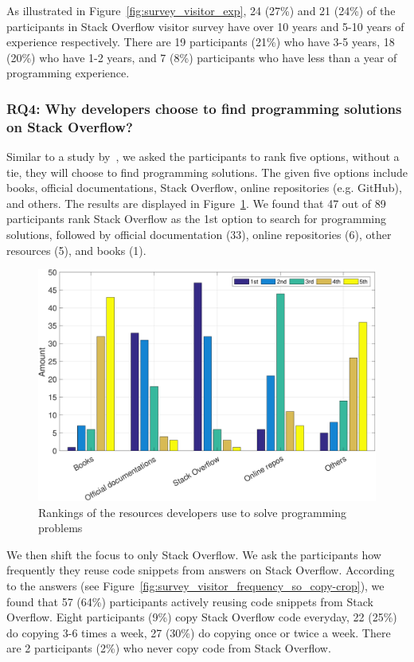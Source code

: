 \documentclass{svjour3}                     %
\begin{document}
As illustrated in Figure~\ref{fig:survey_visitor_exp}, 24 (27\%) and 21 (24\%)
of the participants in Stack Overflow visitor survey have over 10 years and 5-10
years of experience respectively. There are 19 participants (21\%) who have 3-5
years, 18 (20\%) who have 1-2 years, and 7 (8\%) participants who have less than a
year of programming experience.

\subsubsection*{RQ4: Why developers choose to find programming solutions on Stack Overflow?}

Similar to a study by~\cite{Acar2016}, we asked the participants to rank five options, without a tie, they will choose to
find programming solutions. The given five options include books, official documentations, Stack Overflow,
online repositories (e.g. GitHub), and others. The results are displayed in Figure~\ref{fig:survey_visitor_rankings-crop}.
We found that 47 out of 89 participants rank Stack Overflow as the 1st option to search for programming solutions, followed
by official documentation (33), online repositories (6), other resources (5), and books (1).

\begin{figure} \centering
	\includegraphics[width=.5\linewidth]{survey_visitor_rankings-crop} 
	\caption{Rankings of the resources developers use to solve programming problems}
	\label{fig:survey_visitor_rankings-crop} 
\end{figure}

We then shift the focus to only Stack Overflow. We ask the participants how frequently they reuse code snippets from answers on Stack Overflow.
According to the answers (see Figure~\ref{fig:survey_visitor_frequency_so_copy-crop}), we found that 57 (64\%) participants actively reusing
code snippets from Stack Overflow. Eight participants (9\%) copy Stack Overflow
code everyday, 22 (25\%) do copying 3-6 times a week, 27 (30\%) do copying once or twice a week. There are 2 participants (2\%) who never
copy code from Stack Overflow.
\end{document}
